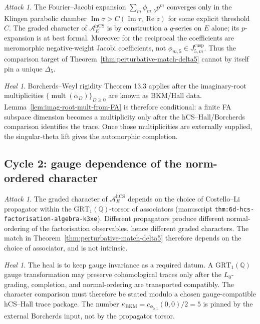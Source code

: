\documentclass[11pt]{amsart}
\providecommand{\Q}{\mathbb{Q}}
\providecommand{\cA}{\mathcal{A}}
\providecommand{\hCS}{\mathrm{hCS}}
\providecommand{\kBKM}{\kappa_{\mathrm{BKM}}}
\providecommand{\Im}{\operatorname{Im}}
\providecommand{\Re}{\operatorname{Re}}
\providecommand{\mult}{\operatorname{mult}}
\theoremstyle{plain}
\theoremstyle{definition}
\theoremstyle{remark}
\newtheorem{attack}[theorem]{Attack}
\newtheorem{heal}[theorem]{Heal}
\begin{document}
\begin{attack}
\label{attack:fj-divergence}
The Fourier--Jacobi expansion $\sum_{m}\phi_{m,5}p^{m}$ converges only
in the Klingen parabolic chamber $\Im\sigma > C(\Im\tau,\Re z)$ for
some explicit threshold $C$. The graded character of $\cA_{E}^{\hCS}$
is by construction a $q$-series on $E$ alone; its $p$-expansion is at
best formal. Moreover for the reciprocal the coefficients are
meromorphic negative-weight Jacobi coefficients, not
$\phi_{m,5}\in J_{5,m}^{\mathrm{cusp}}$. Thus the comparison target of
Theorem~\ref{thm:perturbative-match-delta5} cannot by itself pin a
unique $\Delta_{5}$.
\end{attack}

\begin{heal}
\label{heal:fj-divergence}
Borcherds--Weyl rigidity \cite{Borcherds1998} Theorem 13.3 applies
after the imaginary-root multiplicities
$\{\mult(\alpha_D)\}_{D\geq 0}$ are known as BKM/Hall data.
Lemma~\ref{lem:imag-root-mult-from-FA} is therefore conditional: a finite
FA subspace dimension becomes a multiplicity only after the
hCS--Hall/Borcherds comparison identifies the trace. Once those
multiplicities are externally supplied, the singular-theta lift gives
the automorphic completion.
\end{heal}

\subsection{Cycle 2: gauge dependence of the norm-ordered character}

\begin{attack}
\label{attack:gauge-dependence-character}
The graded character of $\cA_{E}^{\hCS}$ depends on the choice of
Costello--Li propagator within the $\mathrm{GRT}_{1}(\Q)$-torsor of
associators (manuscript \texttt{thm:6d-hcs-factorisation-algebra-k3xe}).
Different propagators produce different normal-ordering of the
factorisation observables, hence different graded characters. The
match in Theorem~\ref{thm:perturbative-match-delta5} therefore depends
on the choice of associator, and is not intrinsic.
\end{attack}

\begin{heal}
\label{heal:gauge-dependence-character}
The heal is to keep gauge invariance as a required datum. A
$\mathrm{GRT}_{1}(\Q)$ gauge transformation may preserve cohomological
traces only after the $L_0$-grading, completion, and normal-ordering
are transported compatibly. The character comparison must therefore be
stated modulo a chosen gauge-compatible hCS--Hall trace package. The
number $\kBKM=c_{\phi_{0,1}}(0,0)/2=5$ is pinned by the external
Borcherds input, not by the propagator torsor.
\end{heal}
\end{document}
